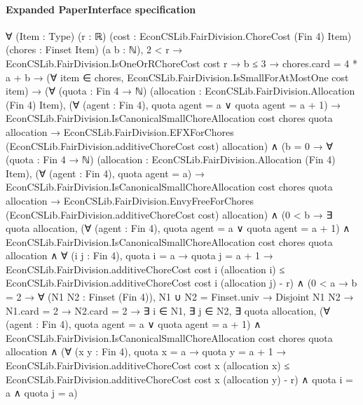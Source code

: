\documentclass[10pt]{article}
\begin{document}
\paragraph{Expanded PaperInterface specification}
\begin{ReviewVerbatim}
∀ (Item : Type) (r : ℝ) (cost : EconCSLib.FairDivision.ChoreCost (Fin 4) Item) (chores : Finset Item) (a b : ℕ),
  2 < r →
    EconCSLib.FairDivision.IsOneOrRChoreCost cost r →
      b ≤ 3 →
        chores.card = 4 * a + b →
          (∀ item ∈ chores, EconCSLib.FairDivision.IsSmallForAtMostOne cost item) →
            (∀ (quota : Fin 4 → ℕ) (allocation : EconCSLib.FairDivision.Allocation (Fin 4) Item),
                (∀ (agent : Fin 4), quota agent = a ∨ quota agent = a + 1) →
                  EconCSLib.FairDivision.IsCanonicalSmallChoreAllocation cost chores quota allocation →
                    EconCSLib.FairDivision.EFXForChores (EconCSLib.FairDivision.additiveChoreCost cost) allocation) ∧
              (b = 0 →
                  ∀ (quota : Fin 4 → ℕ) (allocation : EconCSLib.FairDivision.Allocation (Fin 4) Item),
                    (∀ (agent : Fin 4), quota agent = a) →
                      EconCSLib.FairDivision.IsCanonicalSmallChoreAllocation cost chores quota allocation →
                        EconCSLib.FairDivision.EnvyFreeForChores (EconCSLib.FairDivision.additiveChoreCost cost)
                          allocation) ∧
                (0 < b →
                    ∃ quota allocation,
                      (∀ (agent : Fin 4), quota agent = a ∨ quota agent = a + 1) ∧
                        EconCSLib.FairDivision.IsCanonicalSmallChoreAllocation cost chores quota allocation ∧
                          ∀ (i j : Fin 4),
                            quota i = a →
                              quota j = a + 1 →
                                EconCSLib.FairDivision.additiveChoreCost cost i (allocation i) ≤
                                  EconCSLib.FairDivision.additiveChoreCost cost i (allocation j) - r) ∧
                  (0 < a →
                    b = 2 →
                      ∀ (N1 N2 : Finset (Fin 4)),
                        N1 ∪ N2 = Finset.univ →
                          Disjoint N1 N2 →
                            N1.card = 2 →
                              N2.card = 2 →
                                ∃ i ∈ N1,
                                  ∃ j ∈ N2,
                                    ∃ quota allocation,
                                      (∀ (agent : Fin 4), quota agent = a ∨ quota agent = a + 1) ∧
                                        EconCSLib.FairDivision.IsCanonicalSmallChoreAllocation cost chores quota
                                            allocation ∧
                                          (∀ (x y : Fin 4),
                                              quota x = a →
                                                quota y = a + 1 →
                                                  EconCSLib.FairDivision.additiveChoreCost cost x (allocation x) ≤
                                                    EconCSLib.FairDivision.additiveChoreCost cost x (allocation y) -
                                                      r) ∧
                                            quota i = a ∧ quota j = a)
\end{ReviewVerbatim}
\end{document}
